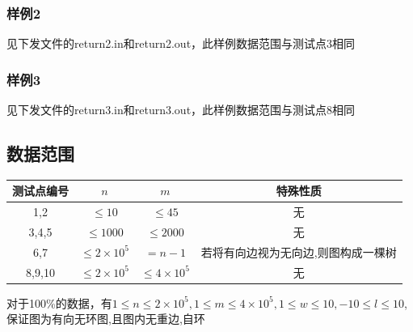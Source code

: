 \documentclass[12pt]{ctexart}
\begin{document}
	\subsubsection{样例2}
	见下发文件的return2.in和return2.out，此样例数据范围与测试点3相同
	\subsubsection{样例3}
	见下发文件的return3.in和return3.out，此样例数据范围与测试点8相同
	\subsection{数据范围}
	\begin{center}
		\begin{tabular}{|c|c|c|c|}
			\hline 测试点编号&$n$&$m$&特殊性质\\
			\hline 1,2&$\le10$&$\le45$&无\\
			\hline 3,4,5&$\le1000$&$\le2000$&无\\
			\hline 6,7&$\le2\times10^5$&$=n-1$&若将有向边视为无向边,则图构成一棵树\\
			\hline 8,9,10&$\le2\times10^5$&$\le4\times10^5$&无\\
			\hline
		\end{tabular}
	\end{center}
	对于100\%的数据，有$1\le n\le2\times10^5,1\le m\le4\times10^5,1\le w\le10,-10\le l\le10$,保证图为有向无环图,且图内无重边,自环
\end{document}
